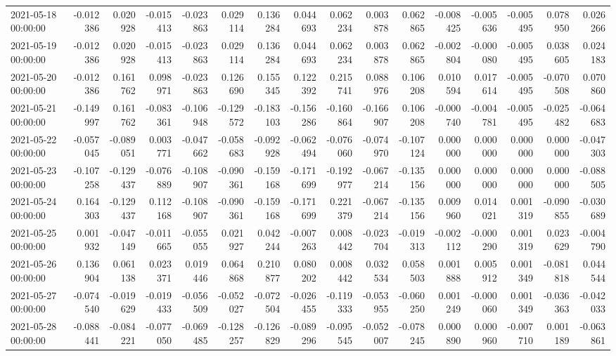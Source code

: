 \begin{tabular}{lrrrrrrrrrrrrrrr}
2021-05-18 00:00:00 & -0.012386 & 0.020928 & -0.015413 & -0.023863 & 0.029114 & 0.136284 & 0.044693 & 0.062234 & 0.003878 & 0.062865 & -0.008425 & -0.005636 & -0.005495 & 0.078950 & 0.026266 \\
2021-05-19 00:00:00 & -0.012386 & 0.020928 & -0.015413 & -0.023863 & 0.029114 & 0.136284 & 0.044693 & 0.062234 & 0.003878 & 0.062865 & -0.002804 & -0.000080 & -0.005495 & 0.038605 & 0.024183 \\
2021-05-20 00:00:00 & -0.012386 & 0.161762 & 0.098971 & -0.023863 & 0.126690 & 0.155345 & 0.122392 & 0.215741 & 0.088976 & 0.106208 & 0.010594 & 0.017614 & -0.005495 & -0.070508 & 0.070860 \\
2021-05-21 00:00:00 & -0.149997 & 0.161762 & -0.083361 & -0.106948 & -0.129572 & -0.183103 & -0.156286 & -0.160864 & -0.166907 & 0.106208 & -0.000740 & -0.004781 & -0.005495 & -0.025482 & -0.064683 \\
2021-05-22 00:00:00 & -0.057045 & -0.089051 & 0.003771 & -0.047662 & -0.058683 & -0.092928 & -0.062494 & -0.076060 & -0.074970 & -0.107124 & 0.000000 & 0.000000 & 0.000000 & 0.000000 & -0.047303 \\
2021-05-23 00:00:00 & -0.107258 & -0.129437 & -0.076889 & -0.108907 & -0.090361 & -0.159168 & -0.171699 & -0.192977 & -0.067214 & -0.135156 & 0.000000 & 0.000000 & 0.000000 & 0.000000 & -0.088505 \\
2021-05-24 00:00:00 & 0.164303 & -0.129437 & 0.112168 & -0.108907 & -0.090361 & -0.159168 & -0.171699 & 0.221379 & -0.067214 & -0.135156 & 0.009960 & 0.014021 & 0.001319 & -0.090855 & -0.030689 \\
2021-05-25 00:00:00 & 0.001932 & -0.047149 & -0.011665 & -0.055055 & 0.021927 & 0.042244 & -0.007263 & 0.008442 & -0.023704 & -0.019313 & -0.002112 & -0.000290 & 0.001319 & 0.023629 & -0.004790 \\
2021-05-26 00:00:00 & 0.136904 & 0.061138 & 0.023371 & 0.019446 & 0.064868 & 0.210877 & 0.080202 & 0.008442 & 0.032534 & 0.058503 & 0.001888 & 0.005912 & 0.001349 & -0.081818 & 0.044544 \\
2021-05-27 00:00:00 & -0.074540 & -0.019629 & -0.019433 & -0.056509 & -0.052027 & -0.072504 & -0.026455 & -0.119333 & -0.053955 & -0.060250 & 0.001249 & -0.000060 & 0.001349 & -0.036363 & -0.042033 \\
2021-05-28 00:00:00 & -0.088441 & -0.084221 & -0.077050 & -0.069485 & -0.128257 & -0.126829 & -0.089296 & -0.095545 & -0.052007 & -0.078245 & 0.000890 & 0.000960 & -0.007710 & 0.001189 & -0.063861 \\

\end{tabular}
